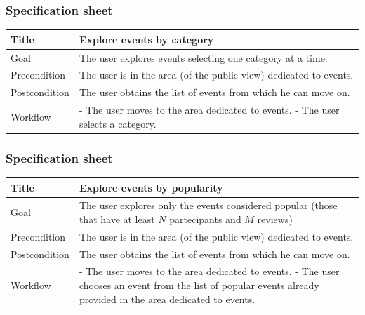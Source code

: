 \documentclass{beamer}
\begin{document}
\begin{frame}
    \frametitle{Specification sheet}
    \begin{table}
        \tiny
        \begin{tabular}{|p{2cm}|p{6cm}|}
        \hline
        Title & \textbf{Explore events by category} \\
        \hline
        Goal & The user explores events selecting one category at a time. \\
        \hline
        Precondition & The user is in the area (of the public view) dedicated to events.\\
        \hline
        Postcondition & The user obtains the list of events from which he can move on.\\
        \hline
        Workflow &
        - The user moves to the area dedicated to events. \newline
        - The user selects a category. \\
        \hline
        \end{tabular}
\end{table}
\end{frame}

\begin{frame}
    \frametitle{Specification sheet}
    \begin{table}
        \tiny
        \begin{tabular}{|p{2cm}|p{6cm}|}
        \hline
        Title & \textbf{Explore events by popularity} \\
        \hline
        Goal & The user explores only the events considered popular (those that have
        at least $N$ partecipants and $M$ reviews) \\
        \hline
        Precondition & The user is in the area (of the public view) dedicated to events.\\
        \hline
        Postcondition & The user obtains the list of events from which he can move on.\\
        \hline
        Workflow &
        - The user moves to the area dedicated to events. \newline
        - The user chooses an event from the list of popular events already provided in the area
        dedicated to events. \\
        \hline
        \end{tabular}
\end{table}
\end{frame}
\end{document}
